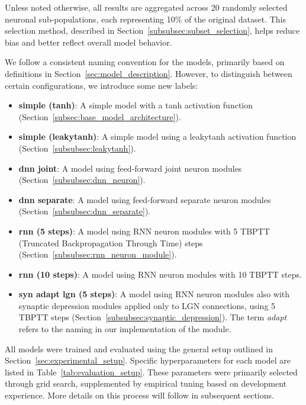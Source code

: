 Unless noted otherwise, all results are aggregated across 20 randomly selected neuronal sub-populations, each representing 10\% of the original dataset. This selection method, described in Section~\ref{subsubsec:subset_selection}, helps reduce bias and better reflect overall model behavior.

We follow a consistent naming convention for the models, primarily based on definitions in Section~\ref{sec:model_description}. However, to distinguish between certain configurations, we introduce some new labels:

\begin{itemize}
    \item \textbf{simple (tanh)}: A simple model with a tanh activation function (Section~\ref{subsec:base_model_architecture}).
    \item \textbf{simple (leakytanh)}: A simple model using a leakytanh activation function (Section~\ref{subsubsec:leakytanh}).
    \item \textbf{dnn joint}: A model using feed-forward joint neuron modules (Section~\ref{subsubsec:dnn_neuron}).
    \item \textbf{dnn separate}: A model using feed-forward separate neuron modules  (Section~\ref{subsubsec:dnn_separate}).
    \item \textbf{rnn (5 steps)}: A model using RNN neuron modules with 5 TBPTT (Truncated Backpropagation Through Time) steps (Section~\ref{subsubsec:rnn_neuron_module}).
    \item \textbf{rnn (10 steps)}: A model using RNN neuron modules with 10 TBPTT steps.
    \item \textbf{syn adapt lgn (5 steps)}: A model using RNN neuron modules also with synaptic depression modules applied only to LGN connections, using 5 TBPTT steps (Section~\ref{subsubsec:synaptic_depression}). The term \textit{adapt} refers to the naming in our implementation of the module.
\end{itemize}

All models were trained and evaluated using the general setup outlined in Section~\ref{sec:experimental_setup}. Specific hyperparameters for each model are listed in Table~\ref{tab:evaluation_setup}. These parameters were primarily selected through grid search, supplemented by empirical tuning based on development experience. More details on this process will follow in subsequent sections.

